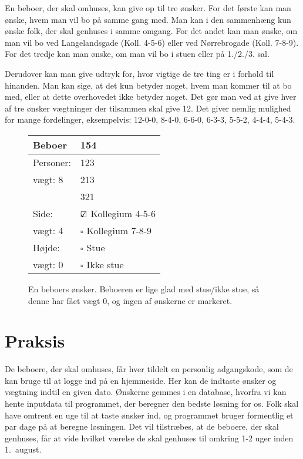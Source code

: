 \documentclass[article,oneside,11pt]{memoir}
\begin{document}
En beboer, der skal omhuses, kan give op til tre ønsker. For det første kan man
ønske, hvem man vil bo på samme gang med. Man kan i den sammenhæng kun ønske
folk, der skal genhuses i samme omgang. For det andet kan man ønske, om man vil
bo ved Langelandsgade (Koll. 4-5-6) eller ved Nørrebrogade (Koll. 7-8-9). For
det tredje kan man ønske, om man vil bo i stuen eller på 1./2./3. sal.

Derudover kan man give udtryk for, hvor vigtige de tre ting er i forhold til
hinanden. Man kan sige, at det kun betyder noget, hvem man kommer til at bo
med, eller at dette overhovedet ikke betyder noget. Det gør man ved at give
hver af tre ønsker vægtninger der tilsammen skal give 12. Det giver nemlig
mulighed for mange fordelinger, eksempelvis: 12-0-0, 8-4-0, 6-6-0, 6-3-3,
5-5-2, 4-4-4, 5-4-3.

\begin{figure}[h]
\begin{center}
\small
\begin{tabular}{ll}
\toprule
Beboer & 154 \\
\midrule
Personer: & 123 \\
vægt: 8 & 213 \\
& 321 \\
\midrule
Side: & $\text{\rlap{$\checkmark$}}\square$ Kollegium 4-5-6 \\
vægt: 4 & $\square$ Kollegium 7-8-9 \\
\midrule
Højde: & $\square$ Stue \\
vægt: 0 & $\square$ Ikke stue \\
\bottomrule
\end{tabular}

\vspace{1em}
\begin{minipage}[t]{0.6\textwidth}
\caption{En beboers ønsker. Beboeren er lige glad med stue/ikke stue, så denne
har fået vægt 0, og ingen af ønskerne er markeret.}
\end{minipage}
\end{center}
\end{figure}

\section{Praksis}

De beboere, der skal omhuses, får hver tildelt en personlig adgangskode, som de
kan bruge til at logge ind på en hjemmeside. Her kan de indtaste ønsker og
vægtning indtil en given dato. Ønskerne gemmes i en database, hvorfra vi kan
hente inputdata til programmet, der beregner den bedste løsning for os. Folk
skal have omtrent en uge til at taste ønsker ind, og programmet bruger
formentlig et par dage på at beregne løsningen. Det vil tilstræbes, at de
beboere, der skal genhuses, får at vide hvilket værelse de skal genhuses til
omkring 1-2 uger inden 1.~august.
\end{document}
